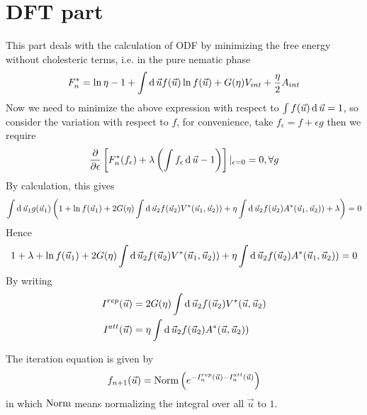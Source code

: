 \section{DFT part}
This part deals with the calculation of ODF by minimizing the free energy without cholesteric terms, i.e. in the pure nematic phase
\begin{equation}
	F_{n}^*=\ln\eta -1+\int\operatorname{d}\vec{u}f(\vec{u})\ln f(\vec{u})+G(\eta)V_{int}+\frac{\eta}{2}A_{int}
\end{equation}
Now we need to minimize the above expression with respect to $\int f(\vec{u})\operatorname{d}\vec{u}=1$, so consider the variation with respect to $f$, for convenience, take $f_{\epsilon}=f+\epsilon g$ then we require
\begin{equation}
	\frac{\partial}{\partial\epsilon}\left[F_{n}^*(f_{\epsilon})+\lambda\left(\int f_{\epsilon}\operatorname{d}\vec{u}-1\right)\right]|_{\epsilon=0}=0, \forall g
\end{equation}
By calculation, this gives
\begin{equation}
	\int\operatorname{d}\vec{u}_1g(\vec{u}_1)\left(1+\ln f(\vec{u}_1)+2G(\eta)\int\operatorname{d}\vec{u}_2f(\vec{u}_2)V^*(\vec{u}_1,\vec{u}_2))+\eta\int\operatorname{d}\vec{u}_2f(\vec{u}_2)A^*(\vec{u}_1,\vec{u}_2))+\lambda\right)=0
\end{equation}
Hence
\begin{equation}
	1+\lambda+\ln f(\vec{u}_1)+2G(\eta)\int\operatorname{d}\vec{u}_2f(\vec{u}_2)V^*(\vec{u}_1,\vec{u}_2))+\eta\int\operatorname{d}\vec{u}_2f(\vec{u}_2)A^*(\vec{u}_1,\vec{u}_2))=0
\end{equation}
By writing
\begin{equation}
	\begin{split}
		I^{rep}(\vec{u})&=2G(\eta)\int\operatorname{d}\vec{u}_2f(\vec{u}_2)V^*(\vec{u},\vec{u}_2)\\
		I^{att}(\vec{u})&=\eta\int\operatorname{d}\vec{u}_2f(\vec{u}_2)A^*(\vec{u},\vec{u}_2))
	\end{split}
\end{equation}

The iteration equation is given by
\begin{equation}
	f_{n+1}(\vec{u})=\operatorname{Norm}\left(e^{-I_n^{rep}(\vec{u})-I_n^{att}(\vec{u})}\right)
\end{equation}
in which $\operatorname{Norm}$ means normalizing the integral over all $\vec{u}$ to $1$.

